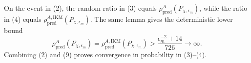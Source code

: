 On the event in (2), the random ratio in (3) equals \(\rho_{\mathrm{pred}}^A(P_{\chi,\epsilon_m})\), while the ratio in (4) equals \(\rho_{\mathrm{pred}}^{A,\mathrm{IKM}}(P_{\chi,\epsilon_m})\).  The same lemma gives the deterministic lower bound
\[
 \rho_{\mathrm{pred}}^A(P_{\chi,\epsilon_m})
 =\rho_{\mathrm{pred}}^{A,\mathrm{IKM}}(P_{\chi,\epsilon_m})
 >\frac{\epsilon_m^{-2}+14}{726}\longrightarrow\infty.                     \tag{9}
\]
Combining (2) and (9) proves convergence in probability in (3)--(4).